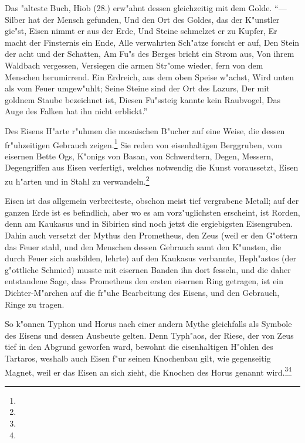 \documentclass[a4paper, 11pt, oneside, polutonikogreek, german]{article}
\begin{document}
Das "alteste Buch, Hiob (28.) erw"ahnt dessen gleichzeitig mit dem Golde. "`--- Silber hat der Mensch gefunden, Und den Ort des Goldes, das der K"unstler gie"st, Eisen nimmt er aus der Erde, Und Steine schmelzet er zu Kupfer, Er macht der Finsternis ein Ende, Alle verwahrten Sch"atze forscht er auf, Den Stein der acht und der Schatten, Am Fu"s des Berges bricht ein Strom aus, Von ihrem Waldbach vergessen, Versiegen die armen Str"ome wieder, fern von dem Menschen herumirrend. Ein Erdreich, aus dem oben Speise w"achst, Wird unten als vom Feuer umgew"uhlt; Seine Steine sind der Ort des Lazurs, Der mit goldnem Staube bezeichnet ist, Diesen Fu"ssteig kannte kein Raubvogel, Das Auge des Falken hat ihn nicht erblickt."'

Des Eisens H"arte r"uhmen die mosaischen B"ucher auf eine Weise, die dessen fr"uhzeitigen Gebrauch zeigen.\footnote{} Sie reden von eisenhaltigen Berggruben, vom eisernen Bette Ogs, K"onigs von Basan, von Schwerdtern, Degen, Messern, Degengriffen aus Eisen verfertigt, welches notwendig die Kunst voraussetzt, Eisen zu h"arten und in Stahl zu verwandeln.\footnote{}

Eisen ist das allgemein verbreiteste, obschon meist tief vergrabene Metall; auf der ganzen Erde ist es befindlich, aber wo es am vorz"uglichsten erscheint, ist Rorden, denn am Kaukasus und in Sibirien sind noch jetzt die ergiebigsten Eisengruben. Dahin auch versetzt der Mythus den Prometheus, den Zeus (weil er den G"ottern das Feuer stahl, und den Menschen dessen Gebrauch samt den K"unsten, die durch Feuer sich ausbilden, lehrte) auf den Kaukasus verbannte, Heph"astos (der g"ottliche Schmied) musste mit eisernen Banden ihn dort fesseln, und die daher entstandene Sage, dass Prometheus den ersten eisernen Ring getragen, ist ein Dichter-M"archen auf die fr"uhe Bearbeitung des Eisens, und den Gebrauch, Ringe zu tragen.

So k"onnen Typhon und Horus nach einer andern Mythe gleichfalls als Symbole des Eisens und dessen Ausbeute gelten. Denn Typh"aos, der Riese, der von Zeus tief in den Abgrund geworfen ward, bewohnt die eisenhaltigen H"ohlen des Tartaros, weshalb auch Eisen f"ur seinen Knochenbau gilt, wie gegenseitig Magnet, weil er das Eisen an sich zieht, die Knochen des Horus genannt wird.\footnote{}\footnote{}
\end{document}
